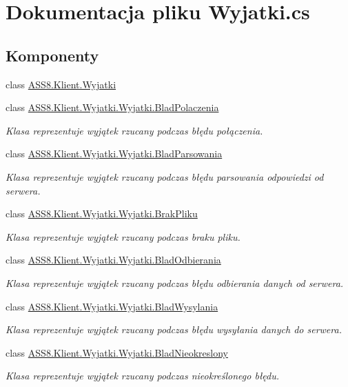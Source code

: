 \hypertarget{a00053}{
\section{Dokumentacja pliku Wyjatki.cs}
\label{dc/dee/a00053}
}
\subsection*{Komponenty}
\begin{CompactItemize}
\item 
class \hyperlink{a00030}{ASS8.Klient.Wyjatki}
\item 
class \hyperlink{a00034}{ASS8.Klient.Wyjatki.Wyjatki.BladPolaczenia}
\begin{CompactList}\small\item\em Klasa reprezentuje wyjątek rzucany podczas błędu połączenia. \item\end{CompactList}\item 
class \hyperlink{a00033}{ASS8.Klient.Wyjatki.Wyjatki.BladParsowania}
\begin{CompactList}\small\item\em Klasa reprezentuje wyjątek rzucany podczas błędu parsowania odpowiedzi od serwera. \item\end{CompactList}\item 
class \hyperlink{a00036}{ASS8.Klient.Wyjatki.Wyjatki.BrakPliku}
\begin{CompactList}\small\item\em Klasa reprezentuje wyjątek rzucany podczas braku pliku. \item\end{CompactList}\item 
class \hyperlink{a00032}{ASS8.Klient.Wyjatki.Wyjatki.BladOdbierania}
\begin{CompactList}\small\item\em Klasa reprezentuje wyjątek rzucany podczas błędu odbierania danych od serwera. \item\end{CompactList}\item 
class \hyperlink{a00035}{ASS8.Klient.Wyjatki.Wyjatki.BladWysylania}
\begin{CompactList}\small\item\em Klasa reprezentuje wyjątek rzucany podczas błędu wysyłania danych do serwera. \item\end{CompactList}\item 
class \hyperlink{a00031}{ASS8.Klient.Wyjatki.Wyjatki.BladNieokreslony}
\begin{CompactList}\small\item\em Klasa reprezentuje wyjątek rzucany podczas nieokreślonego błędu. \item\end{CompactList}\end{CompactItemize}
